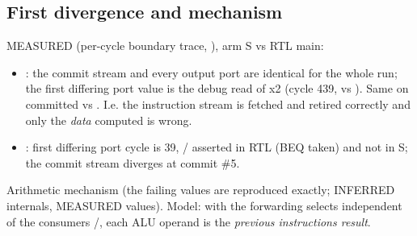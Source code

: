 \subsection{First divergence and mechanism}\label{cr:defect:asap7-cpu-synlig-ma7:first-divergence-and-mechanism}

\begin{record}

MEASURED (per-cycle boundary trace, ),
arm S vs RTL main:

\begin{itemize}
\tightlist
\item
  : the commit stream and every output port are
  identical for the whole run; the first differing port value is the
  debug read of x2 (cycle 439,   vs ).
  Same on committed vs . I.e. the instruction stream is
  fetched and retired correctly and only the \emph{data} computed is
  wrong.
\item
  : first differing port cycle is 39,
   /  asserted in RTL
  (BEQ taken) and not in S; the commit stream diverges at commit \#5.
\end{itemize}

Arithmetic mechanism (the failing values are reproduced exactly;
INFERRED internals, MEASURED values). Model: with the forwarding selects
independent of the consumer\textquotesingle s /,
each ALU operand is the \emph{previous instruction\textquotesingle s
result}.


\end{record}
